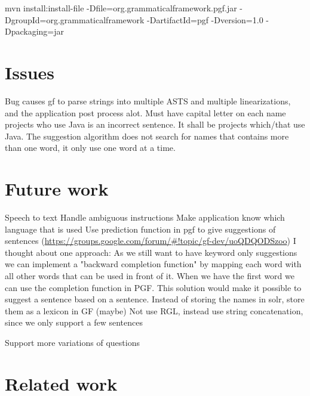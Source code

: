 mvn install:install-file -Dfile=org.grammaticalframework.pgf.jar -DgroupId=org.grammaticalframework -DartifactId=pgf -Dversion=1.0 -Dpackaging=jar

\section{Issues}
Bug causes gf to parse strings into multiple ASTS and multiple linearizations, and the application post process alot.
Must have capital letter on each name
projects who use Java is an incorrect sentence. It shall be projects which/that use Java. The suggestion algorithm does not search for names that contains more than one word, it only use one word at a time.

\section{Future work}
Speech to text
Handle ambiguous instructions
Make application know which language that is used
Use prediction function in pgf to give suggestions of sentences (\url{https://groups.google.com/forum/#!topic/gf-dev/uoQDQODSzoo})
    I thought about one approach: As we still want to have keyword only suggestions we can implement a "backward completion function" by mapping each word with all other words that can be used in front of it.
    When we have the first word we can use the completion function in PGF. This solution would make it possible to suggest a sentence based on a sentence.
Instead of storing the names in solr, store them as a lexicon in GF (maybe)
Not use RGL, instead use string concatenation, since we only support a few sentences

Support more variations of questions 

\section{Related work}
